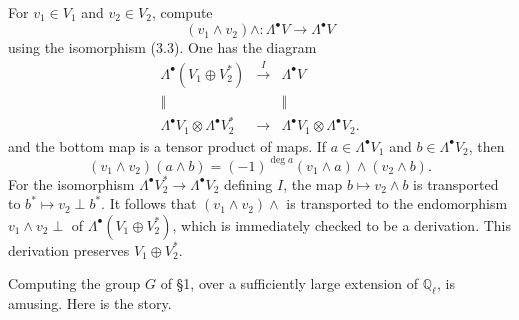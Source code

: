 \documentclass[11pt]{article}
\newcommand{\Q}{\mathbb Q}
\theoremstyle{deligne}
\newcommand{\heading}[1]{\vspace{0.7em}\noindent{\bfseries #1}\quad}
\begin{document}
For $v_1\in V_1$ and $v_2\in V_2$, compute
\[
(v_1\wedge v_2)\wedge:\Lambda^\bullet V\longrightarrow\Lambda^\bullet V
\]
using the isomorphism (3.3). One has the diagram
\[
\begin{array}{ccc}
\Lambda^\bullet(V_1\oplus V_2^*) & \xrightarrow{\ I\ } & \Lambda^\bullet V \\
\Big\Vert && \Big\Vert \\
\Lambda^\bullet V_1\otimes\Lambda^\bullet V_2^* & \longrightarrow & \Lambda^\bullet V_1\otimes\Lambda^\bullet V_2 .
\end{array}
\]
and the bottom map is a tensor product of maps. If $a\in\Lambda^\bullet V_1$ and $b\in\Lambda^\bullet V_2$, then
\[
(v_1\wedge v_2)(a\wedge b)=(-1)^{\deg a}(v_1\wedge a)\wedge(v_2\wedge b).
\]
For the isomorphism $\Lambda^\bullet V_2^*\to\Lambda^\bullet V_2$ defining $I$, the map $b\mapsto v_2\wedge b$ is transported to $b^*\mapsto v_2\perp b^*$. It follows that $(v_1\wedge v_2)\wedge$ is transported to the endomorphism $v_1\wedge v_2\perp$ of $\Lambda^\bullet(V_1\oplus V_2^*)$, which is immediately checked to be a derivation. This derivation preserves $V_1\oplus V_2^*$.

\heading{4.}
Computing the group $G$ of \S1, over a sufficiently large extension of $\Q_\ell$, is amusing. Here is the story.
\end{document}
